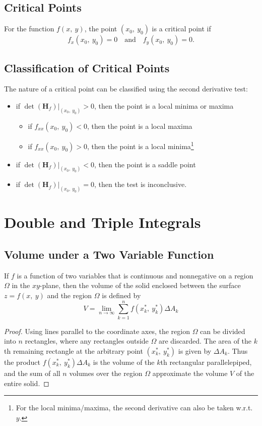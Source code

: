\documentclass{article}
\begin{document}
\subsection{Critical Points}
For the function $f(x,\: y)$, the point $(x_0,\: y_0)$ is a critical point if
\begin{equation*}
    f_x(x_0,\: y_0) = 0 \quad \text{and} \quad f_y(x_0,\: y_0) = 0.
\end{equation*}
\subsection{Classification of Critical Points}
The nature of a critical point can be classified using the second derivative test:
\begin{itemize}
    \item if $\left.\det{\left(\mathbf{H}_f\right)}\right|_{(x_0,\: y_0)} > 0$, then the point is a local minima or maxima
    \begin{itemize}
        \item if $f_{xx}(x_0, \: y_0) < 0$, then the point is a local maxima
        \item if $f_{xx}(x_0, \: y_0) > 0$, then the point is a local minima\footnote[1]{For the local minima/maxima, the second derivative can also be taken w.r.t. $y$.}
    \end{itemize}
    \item if $\left.\det{\left(\mathbf{H}_f\right)}\right|_{(x_0,\: y_0)} < 0$, then the point is a saddle point
    \item if $\left.\det{\left(\mathbf{H}_f\right)}\right|_{(x_0,\: y_0)} = 0$, then the test is inconclusive.
\end{itemize}
\newpage
\section{Double and Triple Integrals}
\subsection{Volume under a Two Variable Function}
\begin{definition}
    If $f$ is a function of two variables that is continuous and nonnegative
    on a region $\Omega$ in the $xy$-plane, then the volume of the solid
    enclosed between the surface $z=f(x,\: y)$ and the region $\Omega$ is
    defined by
    \begin{equation}\label{eq:volume_under_2d_function}
        V = \lim_{n \to \infty} \sum_{k = 1}^n f(x_k^\ast,\: y_k^\ast) \Delta A_k
    \end{equation}
\end{definition}
\begin{proof}
    Using lines parallel to the coordinate axes, the region $\Omega$ can be divided
    into $n$ rectangles, where any rectangles outside $\Omega$ are discarded.
    The area of the $k$th remaining rectangle at the arbitrary point $(x_k^\ast,\: y_k^\ast)$
    is given by $\Delta A_k$. Thus the product $f(x_k^\ast,\: y_k^\ast)\Delta A_k$ is the
    volume of the $k$th rectangular parallelepiped, and the sum of all $n$ volumes over
    the region $\Omega$ approximate the volume $V$ of the entire solid.
\end{proof}
\end{document}
